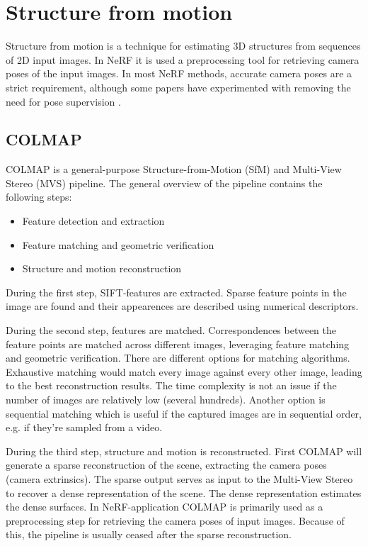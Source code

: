 \section{Structure from motion} \label{sec:sfm}
Structure from motion is a technique for estimating 3D structures from sequences of 2D input images. In NeRF it is used a preprocessing tool for retrieving camera poses of the input images. In most NeRF methods, accurate camera poses are a strict requirement, although some papers have experimented with removing the need for pose supervision \cite{lin_barf_2021}\cite{wang_nerf--_2022}.

\subsection{COLMAP} \label{sec:colmap}
COLMAP is a general-purpose Structure-from-Motion (SfM) \cite{schoenberger2016sfm} and Multi-View Stereo (MVS) \cite{schoenberger2016mvs} pipeline. The general overview of the pipeline contains the following steps:
\begin{itemize}
    \item Feature detection and extraction
    \item Feature matching and geometric verification
    \item Structure and motion reconstruction
\end{itemize}

During the first step, SIFT-features \cite{Lowe2004} are extracted. Sparse feature points in the image are found and their appearences are described using numerical descriptors.


During the second step, features are matched. Correspondences between the feature points are matched across different images, leveraging feature matching and geometric verification. There are different options for matching algorithms. Exhaustive matching would match every image against every other image, leading to the best reconstruction results. The time complexity is not an issue if the number of images are relatively low (several hundreds). Another option is sequential matching which is useful if the captured images are in sequential order, e.g. if they're sampled from a video.

During the third step, structure and motion is reconstructed. First COLMAP will generate a sparse reconstruction of the scene, extracting the camera poses (camera extrinsics). The sparse output serves as input to the Multi-View Stereo to recover a dense representation of the scene. The dense representation estimates the dense surfaces. In NeRF-application COLMAP is primarily used as a preprocessing step for retrieving the camera poses of input images. Because of this, the pipeline is usually ceased after the sparse reconstruction.


